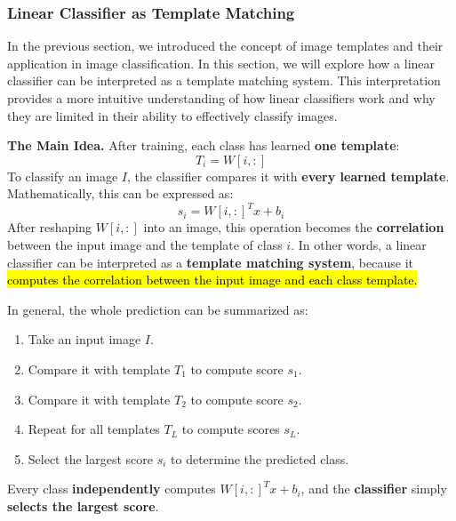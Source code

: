 \subsubsection{Linear Classifier as Template Matching}\label{sec:linear-classifier-as-template-matching}

In the previous section, we introduced the concept of image templates and their application in image classification. In this section, we will explore how a linear classifier can be interpreted as a template matching system. This interpretation provides a more intuitive understanding of how linear classifiers work and why they are limited in their ability to effectively classify images.

\highspace
\textcolor{Green3}{ \textbf{The Main Idea.}} After training, each class has learned \textbf{one template}:
\begin{equation*}
    T_i = W\left[i,:\right]
\end{equation*}
To classify an image $I$, the classifier compares it with \textbf{every learned template}. Mathematically, this can be expressed as:
\begin{equation*}
    s_i = W\left[i,:\right]^T x + b_i
\end{equation*}
After reshaping $W\left[i,:\right]$ into an image, this operation becomes the \textbf{correlation} between the input image and the template of class $i$. In other words, a linear classifier can be interpreted as a \textbf{template matching system}, because it \hl{computes the correlation between the input image and each class template.}

\highspace
\textcolor{Green3}{} In general, the whole prediction can be summarized as:
\begin{enumerate}
    \item Take an input image $I$.
    \item Compare it with template $T_1$ to compute score $s_1$.
    \item Compare it with template $T_2$ to compute score $s_2$.
    \item Repeat for all templates $T_L$ to compute scores $s_L$.
    \item Select the largest score $s_i$ to determine the predicted class.
\end{enumerate}
Every class \textbf{independently} computes $W\left[i,:\right]^T x + b_i$, and the \textbf{classifier} simply \textbf{selects the largest score}.

